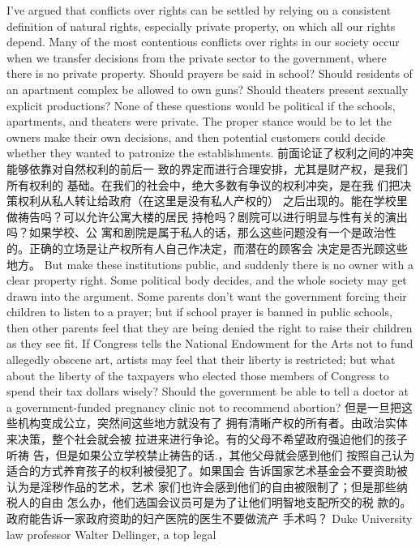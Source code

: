 \begin{paracol}{2}
I've argued that conflicts over rights can be settled by relying
on a consistent definition of natural rights, especially private
property, on which all our rights depend. Many of the most
contentious conflicts over rights in our society occur when we
transfer decisions from the private sector to the government,
where there is no private property. Should prayers be said in
school? Should residents of an apartment complex be allowed to
own guns? Should theaters present sexually explicit productions? None of these questions would be political if the schools,
apartments, and theaters were private. The proper stance
would be to let the owners make their own decisions, and then
potential customers could decide whether they wanted to patronize the establishments.
\switchcolumn
前面论证了权利之间的冲突能够依靠对自然权利的前后一
致的界定而进行合理安排，尤其是财产权，是我们所有权利的
基础。在我们的社会中，绝大多数有争议的权利冲突，是在我
们把决策权利从私人转让给政府（在这里是没有私人产权的）
之后出现的。能在学校里做祷告吗？可以允许公寓大楼的居民
持枪吗？剧院可以进行明显与性有关的演出吗？如果学校、公
寓和剧院是属于私人的话，那么这些问题没有一个是政治性的。正确的立场是让产权所有人自己作决定，而潜在的顾客会
决定是否光顾这些地方。
\switchcolumn*
But make these institutions public, and suddenly there is no
owner with a clear property right. Some political body decides,
and the whole society may get drawn into the argument. Some
parents don't want the government forcing their children to listen to a prayer; but if school prayer is banned in public schools,
then other parents feel that they are being denied the right to
raise their children as they see fit. If Congress tells the National
Endowment for the Arts not to fund allegedly obscene art,
artists may feel that their liberty is restricted; but what about
the liberty of the taxpayers who elected those members of Congress to spend their tax dollars wisely? Should the government
be able to tell a doctor at a government-funded pregnancy
clinic not to recommend abortion?
\switchcolumn
但是一旦把这些机构变成公立，突然间这些地方就没有了
拥有清晰产权的所有者。由政治实体来决策，整个社会就会被
拉进来进行争论。有的父母不希望政府强迫他们的孩子听祷
告，但是如果公立学校禁止祷告的话.，其他父母就会感到他们
按照自己认为适合的方式养育孩子的权利被侵犯了。如果国会
告诉国家艺术基金会不要资助被认为是淫秽作品的艺术，艺术
家们也许会感到他们的自由被限制了；但是那些纳税人的自由
怎么办，他们选国会议员可是为了让他们明智地支配所交的税
款的。政府能告诉一家政府资助的妇产医院的医生不要做流产
手术吗？
\switchcolumn*
Duke University law professor Walter Dellinger, a top legal

\end{paracol}
